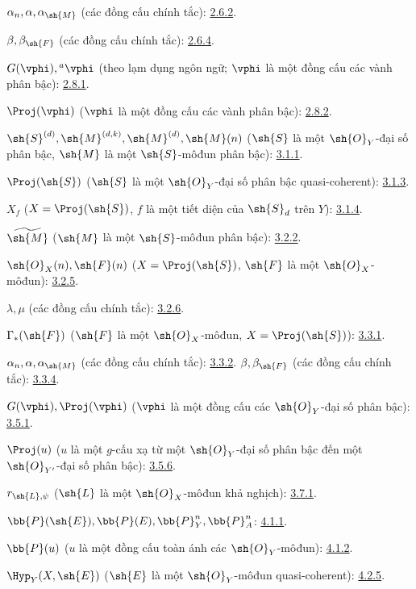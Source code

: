 \documentclass[oneside,10pt]{amsart}
\newcommand{\oldpage}[2][]{\marginnote{\normalfont\footnotesize\textbf{#1}~|~#2}\ignorespaces}
\begin{document}
$\alpha_n,\alpha,\alpha_{\sh{M}}$ (các đồng cấu chính tắc): \hyperref[II.2.6.2]{2.6.2}.

$\beta,\beta_{\sh{F}}$ (các đồng cấu chính tắc): \hyperref[II.2.6.4]{2.6.4}.

$G(\vphi),{}^a\vphi$ (theo lạm dụng ngôn ngữ;
$\vphi$ là một đồng cấu các vành phân bậc): \hyperref[II.2.8.1]{2.8.1}.

$\Proj(\vphi)$ ($\vphi$ là một đồng cấu các vành phân bậc): \hyperref[II.2.8.2]{2.8.2}.

$\sh{S}^{(d)},\sh{M}^{(d,k)},\sh{M}^{(d)},\sh{M}(n)$
($\sh{S}$ là một $\sh{O}_Y$-đại số phân bậc,
$\sh{M}$ là một $\sh{S}$-môđun phân bậc): \hyperref[II.3.1.1]{3.1.1}.

$\Proj(\sh{S})$ ($\sh{S}$ là một $\sh{O}_Y$-đại số phân bậc quasi-coherent): \hyperref[II.3.1.3]{3.1.3}.

$X_f$ ($X=\Proj(\sh{S})$, $f$ là một tiết diện của $\sh{S}_d$ trên $Y$): \hyperref[II.3.1.4]{3.1.4}.

$\widetilde{\sh{M}}$ ($\sh{M}$ là một $\sh{S}$-môđun phân bậc): \hyperref[II.3.2.2]{3.2.2}.

$\sh{O}_X(n),\sh{F}(n)$
($X=\Proj(\sh{S})$, $\sh{F}$ là một $\sh{O}_X$-môđun): \hyperref[II.3.2.5]{3.2.5}.

$\lambda,\mu$ (các đồng cấu chính tắc): \hyperref[II.3.2.6]{3.2.6}.

$\Gamma_*(\sh{F})$ ($\sh{F}$ là một $\sh{O}_X$-môđun,
$X=\Proj(\sh{S})$): \hyperref[II.3.3.1]{3.3.1}.

$\alpha_n,\alpha,\alpha_{\sh{M}}$ (các đồng cấu chính tắc): \hyperref[II.3.3.2]{3.3.2}.
\oldpage[II]{208}
$\beta,\beta_{\sh{F}}$ (các đồng cấu chính tắc): \hyperref[II.3.3.4]{3.3.4}.

$G(\vphi),\Proj(\vphi)$
($\vphi$ là một đồng cấu các $\sh{O}_Y$-đại số phân bậc): \hyperref[II.3.5.1]{3.5.1}.

$\Proj(u)$ ($u$ là một $g$-cấu xạ từ một $\sh{O}_Y$-đại số phân bậc
đến một $\sh{O}_{Y'}$-đại số phân bậc): \hyperref[II.3.5.6]{3.5.6}.

$r_{\sh{L},\psi}$ ($\sh{L}$ là một $\sh{O}_X$-môđun khả nghịch): \hyperref[II.3.7.1]{3.7.1}.

$\bb{P}(\sh{E}),\bb{P}(E),\bb{P}_Y^n,\bb{P}_A^n$: \hyperref[II.4.1.1]{4.1.1}.

$\bb{P}(u)$ ($u$ là một đồng cấu toàn ánh các $\sh{O}_Y$-môđun): \hyperref[II.4.1.2]{4.1.2}.

$\Hyp_Y(X,\sh{E})$ ($\sh{E}$ là một $\sh{O}_Y$-môđun quasi-coherent): \hyperref[II.4.2.5]{4.2.5}.
\end{document}
